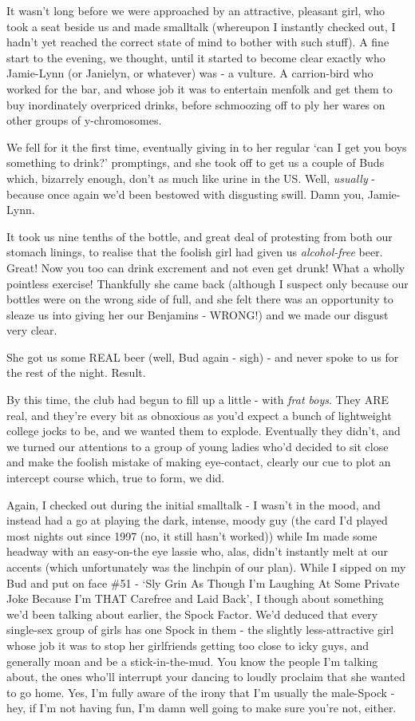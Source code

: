 \documentclass[a5paper,10pt,titlepage,draft]{book}
\begin{document}
It wasn't long before we were approached by an attractive, pleasant girl, who took a seat beside us and made smalltalk (whereupon I instantly checked out, I hadn't yet reached the correct state of mind to bother with such stuff).  A fine start to the evening, we thought, until it started to become clear exactly who Jamie-Lynn (or Janielyn, or whatever) was - a vulture.  A carrion-bird who worked for the bar, and whose job it was to entertain menfolk and get them to buy inordinately overpriced drinks, before schmoozing off to ply her wares on other groups of y-chromosomes.

We fell for it the first time, eventually giving in to her regular `can I get you boys something to drink?' promptings, and she took off to get us a couple of Buds which, bizarrely enough, don't as much like urine in the US.  Well, \emph{usually} - because once again we'd been bestowed with disgusting swill.  Damn you, Jamie-Lynn.

It took us nine tenths of the bottle, and great deal of protesting from both our stomach linings, to realise that the foolish girl had given us \emph{alcohol-free} beer.  Great!  Now you too can drink excrement and not even get drunk!  What a wholly pointless exercise!  Thankfully she came back (although I suspect only because our bottles were on the wrong side of full, and she felt there was an opportunity to sleaze us into giving her our Benjamins - WRONG!) and we made our disgust very clear.

She got us some REAL beer (well, Bud again - sigh) - and never spoke to us for the rest of the night.  Result.

By this time, the club had begun to fill up a little - with \emph{frat boys}.  They ARE real, and they're every bit as obnoxious as you'd expect a bunch of lightweight college jocks to be, and we wanted them to explode.  Eventually they didn't, and we turned our attentions to a group of young ladies who'd decided to sit close and make the foolish mistake of making eye-contact, clearly our cue to plot an intercept course which, true to form, we did.

Again, I checked out during the initial smalltalk - I wasn't in the mood, and instead had a go at playing the dark, intense, moody guy (the card I'd played most nights out since 1997 (no, it still hasn't worked)) while Im made some headway with an easy-on-the eye lassie who, alas, didn't instantly melt at our accents (which unfortunately was the linchpin of our plan).  While I sipped on my Bud and put on face \#51 - `Sly Grin As Though I'm Laughing At Some Private Joke Because I'm THAT Carefree and Laid Back', I though about something we'd been talking about earlier, the Spock Factor.  We'd deduced that every single-sex group of girls has one Spock in them - the slightly less-attractive girl whose job it was to stop her girlfriends getting too close to icky guys, and generally moan and be a stick-in-the-mud.  You know the people I'm talking about, the ones who'll interrupt your dancing to loudly proclaim that she wanted to go home.  Yes, I'm fully aware of the irony that I'm usually the male-Spock - hey, if I'm not having fun, I'm damn well going to make sure you're not, either.
\end{document}
